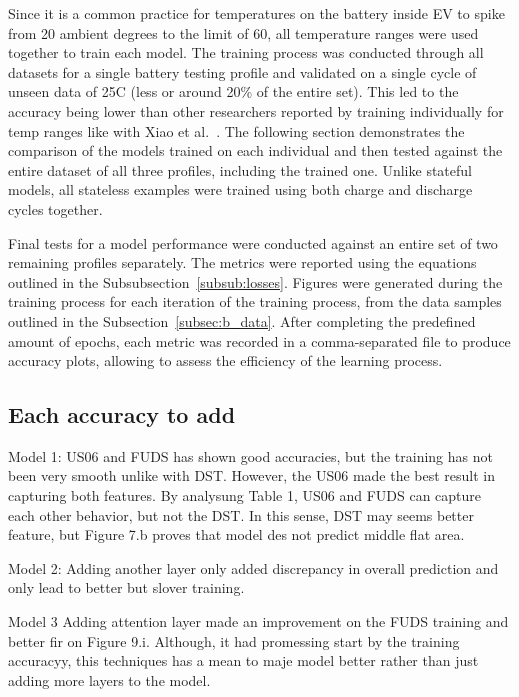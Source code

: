 Since it is a common practice for temperatures on the battery inside EV to spike from 20 ambient degrees to the limit of 60, all temperature ranges were used together to train each model.
The training process was conducted through all datasets for a single battery testing profile and validated on a single cycle of unseen data of 25\textdegree{}C (less or around 20\% of the entire set).
This led to the accuracy being lower than other researchers reported by training individually for temp ranges like with Xiao et al.~\cite{xiao_accurate_2019}.
The following section demonstrates the comparison of the models trained on each individual and then tested against the entire dataset of all three profiles, including the trained one.
Unlike stateful models, all stateless examples were trained using both charge and discharge cycles together.

%
%
Final tests for a model performance were conducted against an entire set of two remaining profiles separately.
The metrics were reported using the equations outlined in the \mbox{Subsubsection~\ref{subsub:losses}}.
Figures were generated during the training process for each iteration of the training process, from the data samples outlined in the \mbox{Subsection~\ref{subsec:b_data}}.
After completing the predefined amount of epochs, each metric was recorded in a comma-separated file to produce accuracy plots, allowing to assess the efficiency of the learning process.

%
\subsection{Each accuracy to add}
Model 1: US06 and FUDS has shown good accuracies, but the training has not been very smooth unlike with DST.
However, the US06 made the best result in capturing both features.
By analysung Table 1, US06 and FUDS can capture each other behavior, but not the DST.
In this sense, DST may seems better feature, but Figure 7.b proves that model des not predict middle flat area.

%
%
Model 2: Adding another layer only added discrepancy in overall prediction and only lead to better but slover training.

%
%
Model 3 Adding attention layer made an improvement on the FUDS training and better fir on Figure 9.i.
Although, it had promessing start by the training accuracyy, this techniques has a mean to maje model better rather than just adding more layers to the model.

